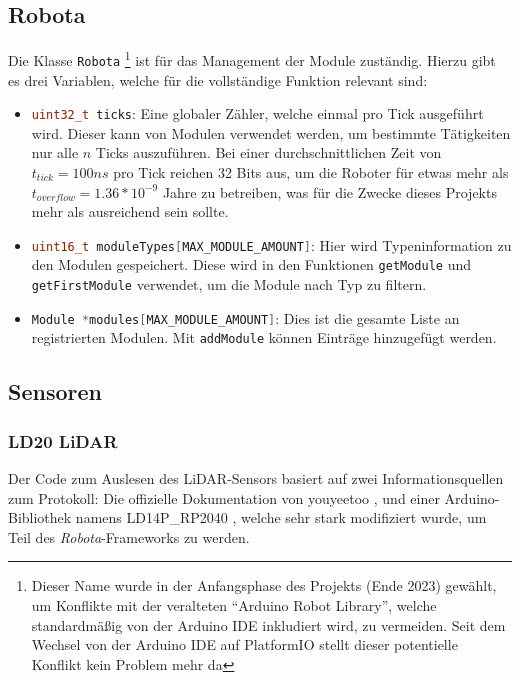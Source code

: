 \subsection{Robota}
Die Klasse \texttt{Robota}%
\footnote{Dieser Name wurde in der Anfangsphase des Projekts (Ende 2023) gewählt, 
        um Konflikte mit der veralteten ``Arduino Robot Library'',
        welche standardmäßig von der Arduino IDE inkludiert wird,
        zu vermeiden.
        Seit dem Wechsel von der Arduino IDE auf PlatformIO stellt dieser potentielle Konflikt kein Problem mehr da}
ist für das Management der Module zuständig.
%
Hierzu gibt es drei Variablen, welche für die vollständige Funktion relevant sind:
\begin{itemize}
    \item \lstinline[language=c]|uint32_t ticks|:
        Eine globaler Zähler, welche einmal pro Tick ausgeführt wird.
        Dieser kann von Modulen verwendet werden, um bestimmte Tätigkeiten nur alle $n$ Ticks auszuführen.
        Bei einer durchschnittlichen Zeit von $t_{tick}=100ns$ pro Tick reichen 32 Bits aus,
        um die Roboter für etwas mehr als $t_{overflow}=1.36*10^{-9}$ Jahre zu betreiben,
        was für die Zwecke dieses Projekts mehr als ausreichend sein sollte.
    \item \lstinline[language=c]|uint16_t moduleTypes[MAX_MODULE_AMOUNT]|:
        Hier wird Typeninformation zu den Modulen gespeichert.
        Diese wird in den Funktionen \texttt{getModule} und \texttt{getFirstModule} verwendet,
        um die Module nach Typ zu filtern.
    \item \lstinline[language=c]|Module *modules[MAX_MODULE_AMOUNT]|:
        Dies ist die gesamte Liste an registrierten Modulen.
        Mit \texttt{addModule} können Einträge hinzugefügt werden.
\end{itemize}

\subsection{Sensoren}
\subsubsection{LD20 LiDAR}
Der Code zum Auslesen des LiDAR-Sensors basiert auf zwei Informationsquellen zum Protokoll:
%
Die offizielle Dokumentation von youyeetoo \cite{youyeetoo-ld20},
und einer Arduino-Bibliothek namens LD14P\_RP2040 \cite{ld20-library},
welche sehr stark modifiziert wurde, um Teil des \textit{Robota}-Frameworks zu werden.

